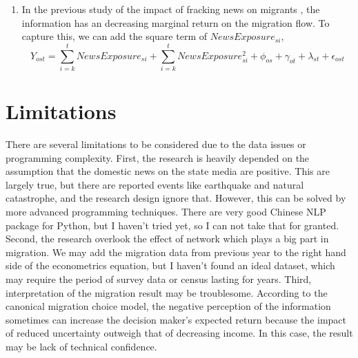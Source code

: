 \documentclass{article}
\begin{document}
\begin{enumerate}
    \item In the previous study of the impact of fracking news on migrants \parencite{Wilson:2021wi}, the information has an decreasing marginal return on the migration flow. To capture this, we can add the square term of $NewsExposure_{si}$,
    \begin{equation}
     Y_{ost}=\sum_{i=k}^{t}NewsExposure_{si}+ \sum_{i=k}^{t}NewsExposure_{si}^2+ \phi_{os}+ \gamma_{ot}+ \lambda_{st}+\epsilon_{ost} 
    \end{equation}
    
\end{enumerate}

\section{Limitations}
There are several limitations to be considered due to the data issues or programming complexity. First, the research is heavily depended on the assumption that the domestic news on the state media are positive. This are largely true, but there are reported events like earthquake and natural catastrophe, and the research design ignore that. However, this can be solved by more advanced programming techniques. There are very good Chinese NLP package for Python, but I haven't tried yet, so I can not take that for granted. Second, the research overlook the effect of network which plays a big part in migration. We may add the migration data from previous year to the right hand side of the econometrics equation, but I haven't found an ideal dataset, which may require the period of survey data or census lasting for years.  Third, interpretation of the migration result may be troublesome. According to the canonical migration choice model, the negative perception of the information sometimes can increase the decision maker's expected return because the impact of reduced uncertainty outweigh that of decreasing income. In this case, the result may be lack of technical confidence.





\bigskip


\newpage
\linespread{1.6}
\printbibliography
\end{document}
